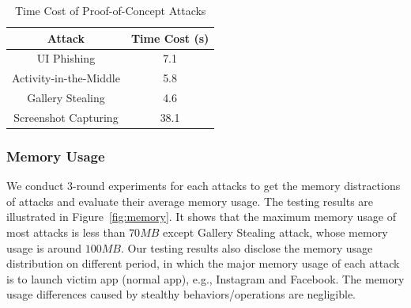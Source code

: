 \documentclass[letterpaper,12pt]{article}
\begin{document}
\begin{table}[h]
  \centering
\caption{Time Cost of Proof-of-Concept Attacks}
\label{tbl:time}
\begin{footnotesize}
\begin{tabular}{|c|c|}
  \hline
  \textbf{Attack} & \textbf{Time Cost (s)} \\
  \hline\hline
  UI Phishing & 7.1\\
  \hline
  Activity-in-the-Middle & 5.8\\
  \hline
  Gallery Stealing & 4.6 \\
  \hline
  Screenshot Capturing & 38.1\\
  \hline
\end{tabular}
\end{footnotesize}
\end{table}

\subsubsection{Memory Usage}

We conduct 3-round experiments for each attacks to get the memory
distractions of attacks and evaluate their average memory usage. The
testing results are illustrated in Figure~\ref{fig:memory}.  It shows
that the maximum memory usage of most attacks is less than $70MB$ except
Gallery Stealing attack, whose memory usage is around $100MB$. Our
testing results also disclose the memory usage distribution on
different period, in which the major memory usage of each attack is to
launch victim app (normal app), e.g., Instagram and Facebook. The
memory usage differences caused by stealthy behaviors/operations are
negligible.
\end{document}
